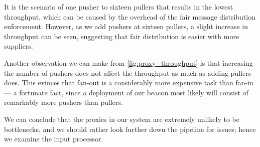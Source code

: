 It is the scenario of one pusher to sixteen pullers that results in the lowest throughput, which can be caused by the overhead of the fair message distribution enforcement.
However, as we add pushers at sixteen pullers, a slight increase in throughput can be seen, suggesting that fair distribution is easier with more suppliers.

Another observation we can make from \cref{fig:proxy_throughput} is that increasing the number of pushers does not affect the throughput as much as adding pullers does.
This evinces that fan-out is a considerably more expensive task than fan-in --- a fortunate fact, since a deployment of our beacon most likely will consist of remarkably more pushers than pullers.

We can conclude that the proxies in our system are extremely unlikely to be bottlenecks, and we should rather look further down the pipeline for issues; hence we examine the input processor.


